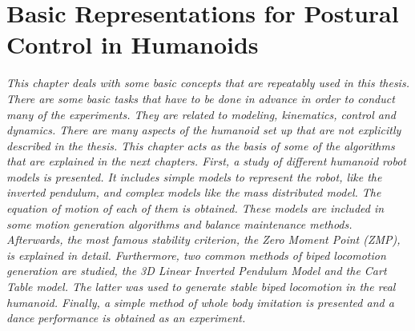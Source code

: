 \chapter{Basic Representations for Postural Control in Humanoids}\label{ch_basics}
\textit{This chapter deals with some basic concepts that are repeatably used in this thesis. There are some basic tasks that have to be done in advance in order to conduct many of the experiments. They are related to modeling, kinematics, control and dynamics. There are many aspects of the humanoid set up that are not explicitly described in the thesis. This chapter acts as the basis of some of the algorithms that are explained in the next chapters. First, a study of different humanoid robot models is presented. It includes simple models to represent the robot, like the inverted pendulum, and complex models like the mass distributed model. The equation of motion of each of them is obtained. These models are included in some  motion generation algorithms and balance maintenance methods. Afterwards, the most famous stability criterion, the Zero Moment Point (ZMP),  is explained in detail. Furthermore, two common methods of biped locomotion generation are studied, the 3D Linear Inverted Pendulum Model and the Cart Table model. The latter was used to generate stable biped locomotion in the real humanoid. Finally, a simple method of whole body imitation is presented and a dance performance is obtained as an experiment. }
\newpage
%
%
%
%
%

